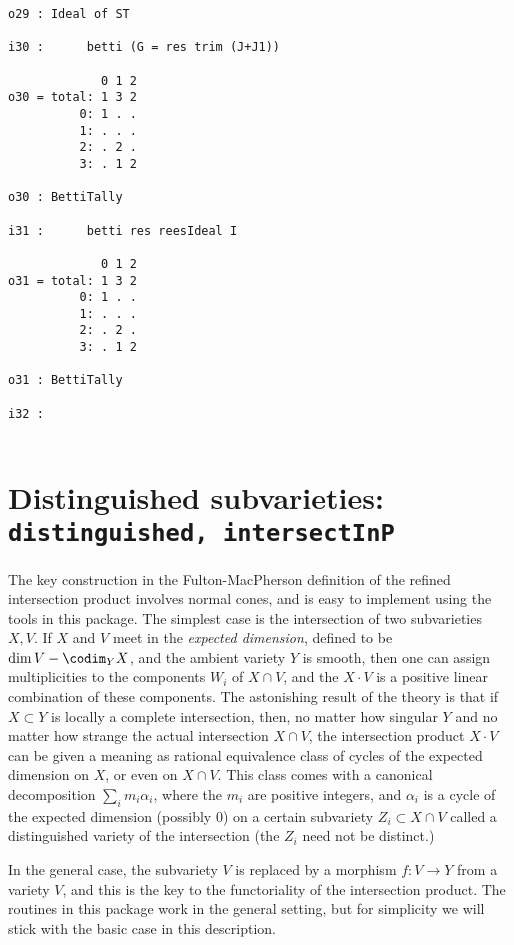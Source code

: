 \documentclass[twoside,12pt, leqno]{amsart}
\begin{document}
\begin{verbatim}
o29 : Ideal of ST

i30 :      betti (G = res trim (J+J1))

             0 1 2
o30 = total: 1 3 2
          0: 1 . .
          1: . . .
          2: . 2 .
          3: . 1 2

o30 : BettiTally

i31 :      betti res reesIdeal I

             0 1 2
o31 = total: 1 3 2
          0: 1 . .
          1: . . .
          2: . 2 .
          3: . 1 2

o31 : BettiTally

i32 : 
  
  \end{verbatim}
   
     

\section{Distinguished subvarieties: {\tt distinguished, intersectInP}}

The key construction in the Fulton-MacPherson definition of the refined intersection  product 
\cite[Section 6.1]{F}
involves normal cones, and is easy to implement using the tools in this package. The simplest case is the intersection of two subvarieties $X,V$. If $X$ and $V$ meet in the \emph{expected dimension}, defined to be $\dim V - \codim_{Y} X$,
and the ambient variety $Y$ is smooth, then one can assign multiplicities to the components $W_{i}$ of $X\cap V$, and the $X\cdot V$ is a positive linear
combination of these components. The astonishing result of the theory is that if $X\subset Y$ is locally a complete intersection, then, no matter how singular $Y$ and no matter how strange the actual intersection $X\cap V$, the intersection product 
$X\cdot V$ can be given a meaning as rational equivalence class of cycles of the expected dimension on $X$, or even on $X\cap V$. This class comes with a canonical decomposition $\sum_{i}m_{i}\alpha_{i}$, 
where the $m_{i}$ are positive integers, and $\alpha_{i}$ is a cycle of the expected dimension (possibly 0)
on a certain subvariety $Z_{i}\subset X\cap V$ called a distinguished variety of the intersection (the $Z_{i}$ need not be distinct.)

In the general case, the subvariety $V$ is replaced by a morphism $f:V\to Y$ from a variety $V$, and this is the key to the functoriality of the intersection product. The routines in this package work in the general setting, but for simplicity we will stick with the basic case in this description.
\end{document}
